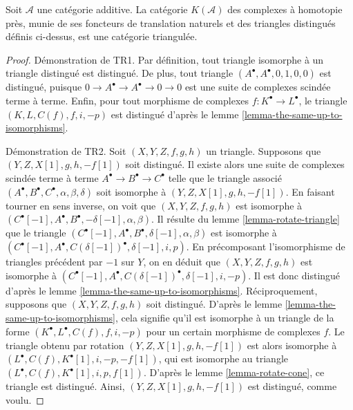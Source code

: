 \begin{proposition}
\label{proposition-homotopy-category-triangulated}
Soit $\mathcal{A}$ une catégorie additive. La catégorie $K(\mathcal{A})$ des
complexes à homotopie près, munie de ses foncteurs de translation naturels et
des triangles distingués définis ci-dessus, est une catégorie triangulée.
\end{proposition}

\begin{proof}
Démonstration de TR1. Par définition, tout triangle isomorphe à un triangle
distingué est distingué. De plus, tout triangle
$(A^\bullet, A^\bullet, 0, 1, 0, 0)$ est distingué, puisque
$0 \to A^\bullet \to A^\bullet \to 0 \to 0$ est une suite de complexes
scindée terme à terme. Enfin, pour tout morphisme de complexes
$f : K^\bullet \to L^\bullet$, le triangle
$(K, L, C(f), f, i, -p)$ est distingué d'après le
lemme \ref{lemma-the-same-up-to-isomorphisms}.

\medskip\noindent
Démonstration de TR2. Soit $(X, Y, Z, f, g, h)$ un triangle. Supposons que
$(Y, Z, X[1], g, h, -f[1])$ soit distingué. Il existe alors une suite de
complexes scindée terme à terme $A^\bullet \to B^\bullet \to C^\bullet$ telle
que le triangle associé
$(A^\bullet, B^\bullet, C^\bullet, \alpha, \beta, \delta)$ soit isomorphe à
$(Y, Z, X[1], g, h, -f[1])$. En faisant tourner en sens inverse, on voit que
$(X, Y, Z, f, g, h)$ est isomorphe à
$(C^\bullet[-1], A^\bullet, B^\bullet, -\delta[-1], \alpha, \beta)$.
Il résulte du lemme \ref{lemma-rotate-triangle} que le triangle
$(C^\bullet[-1], A^\bullet, B^\bullet, \delta[-1], \alpha, \beta)$ est
isomorphe à
$(C^\bullet[-1], A^\bullet, C(\delta[-1])^\bullet, \delta[-1], i, p)$.
En précomposant l'isomorphisme de triangles précédent par $-1$ sur $Y$, on en
déduit que $(X, Y, Z, f, g, h)$ est isomorphe à
$(C^\bullet[-1], A^\bullet, C(\delta[-1])^\bullet, \delta[-1], i, -p)$.
Il est donc distingué d'après le
lemme \ref{lemma-the-same-up-to-isomorphisms}.
Réciproquement, supposons que $(X, Y, Z, f, g, h)$ soit distingué. D'après le
lemme \ref{lemma-the-same-up-to-isomorphisms}, cela signifie qu'il est
isomorphe à un triangle de la forme
$(K^\bullet, L^\bullet, C(f), f, i, -p)$ pour un certain morphisme de
complexes $f$. Le triangle obtenu par rotation
$(Y, Z, X[1], g, h, -f[1])$ est alors isomorphe à
$(L^\bullet, C(f), K^\bullet[1], i, -p, -f[1])$, qui est isomorphe au triangle
$(L^\bullet, C(f), K^\bullet[1], i, p, f[1])$. D'après le
lemme \ref{lemma-rotate-cone}, ce triangle est distingué. Ainsi,
$(Y, Z, X[1], g, h, -f[1])$ est distingué, comme voulu.


\end{proof}
